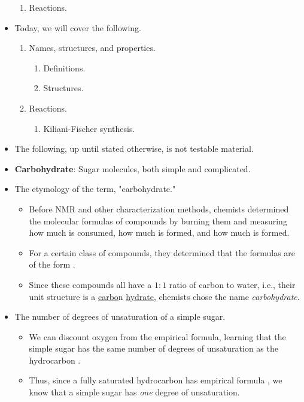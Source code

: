 \documentclass[../notes.tex]{subfiles}
\begin{document}
\begin{itemize}
\begin{enumerate}[label={\Roman*.}]
        \item Reactions.
    \end{enumerate}
    \item Today, we will cover the following.
    \begin{enumerate}[label={\Roman*.}]
        \item Names, structures, and properties.
        \begin{enumerate}[label={\Alph*.}]
            \item Definitions.
            \item Structures.
        \end{enumerate}
        \item Reactions.
        \begin{enumerate}[label={\Alph*.}]
            \item Kiliani-Fischer synthesis.
        \end{enumerate}
    \end{enumerate}
    \item The following, up until stated otherwise, is not testable material.
    \item \textbf{Carbohydrate}: Sugar molecules, both simple and complicated.
    \item The etymology of the term, "carbohydrate."
    \begin{itemize}
        \item Before NMR and other characterization methods, chemists determined the molecular formulas of compounds by burning them and measuring how much  is consumed, how much  is formed, and how much  is formed.
        \item For a certain class of compounds, they determined that the formulas are of the form .
        \item Since these compounds all have a $1:1$ ratio of carbon to water, i.e., their unit structure is a \underline{carbo\vphantom{y}}n \underline{hydrate}, chemists chose the name \emph{carbohydrate}.
    \end{itemize}
    \item The number of degrees of unsaturation of a simple sugar.
    \begin{itemize}
        \item We can discount oxygen from the empirical formula, learning that the simple sugar  has the same number of degrees of unsaturation as the hydrocarbon .
        \item Thus, since a fully saturated hydrocarbon has empirical formula , we know that a simple sugar has \emph{one} degree of unsaturation.

\end{itemize}
\end{itemize}
\end{document}
